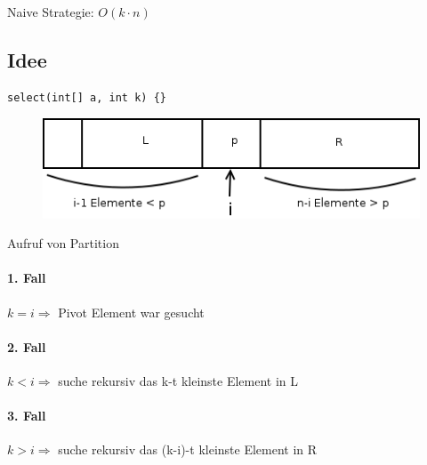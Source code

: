Naive Strategie: $O(k \cdot n)$


\subsection*{Idee} 

\begin{lstlisting}
select(int[] a, int k) {}
\end{lstlisting}

\begin{figure}
\vspace{-25pt}
\includegraphics[width=\linewidth]{06/Grafik/img5.png}
\caption{}
\end{figure}

\vspace{30pt}
Aufruf von Partition
\vspace{90pt}

\paragraph{1. Fall} $k=i \Rightarrow$ Pivot Element war gesucht
\paragraph{2. Fall} $k<i \Rightarrow$ suche rekursiv das k-t kleinste Element in L 
\paragraph{3. Fall} $k>i \Rightarrow$ suche rekursiv das (k-i)-t kleinste Element in R
